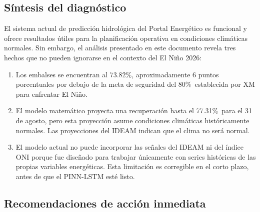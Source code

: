 \documentclass[11pt,a4paper]{article}
\newcommand{\EMBALSEACTUAL}{73.82\%}
\newcommand{\METAXM}{80\%}
\newcommand{\PREDAGOSTO}{77.31\%}
\begin{document}
\subsection{Síntesis del diagnóstico}

El sistema actual de predicción hidrológica del Portal Energético es funcional y ofrece resultados útiles para la planificación operativa en condiciones climáticas normales. Sin embargo, el análisis presentado en este documento revela tres hechos que no pueden ignorarse en el contexto del El Niño 2026:

\begin{enumerate}[leftmargin=*,itemsep=4pt]
\item Los embalses se encuentran al \EMBALSEACTUAL, aproximadamente 6 puntos porcentuales por debajo de la meta de seguridad del \METAXM\ establecida por XM para enfrentar El Niño.
\item El modelo matemático proyecta una recuperación hasta el \PREDAGOSTO\ para el 31 de agosto, pero esta proyección asume condiciones climáticas históricamente normales. Las proyecciones del IDEAM indican que el clima no será normal.
\item El modelo actual no puede incorporar las señales del IDEAM ni del índice ONI porque fue diseñado para trabajar únicamente con series históricas de las propias variables energéticas. Esta limitación es corregible en el corto plazo, antes de que el PINN-LSTM esté listo.
\end{enumerate}

\subsection{Recomendaciones de acción inmediata}
\end{document}
